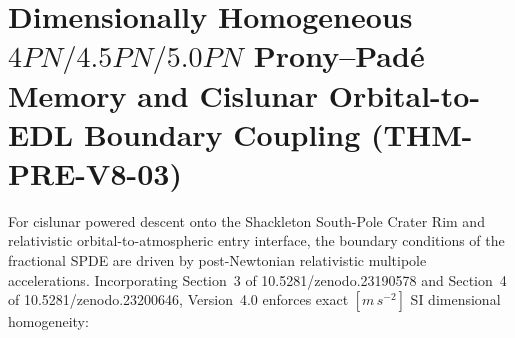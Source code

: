 \documentclass[11pt,a4paper,reqno]{article}
\def\texttt#1{#1}%
\def\mathrm#1{#1}%
\def\zenodo#1{10.5281/zenodo.#1}%
\newcommand{\zenodo}[1]{\href{https://doi.org/10.5281/zenodo.#1}{\texttt{10.5281/\allowbreak zenodo.#1}}}
\theoremstyle{plain}
\theoremstyle{definition}
\theoremstyle{remark}
\numberwithin{equation}{section}
\begin{document}
\section{Dimensionally Homogeneous \texorpdfstring{$4\mathrm{PN}/4.5\mathrm{PN}/5.0\mathrm{PN}$}{4PN/4.5PN/5.0PN} Prony--Pad\'e Memory and Cislunar Orbital-to-EDL Boundary Coupling (\texttt{THM-PRE-V8-03})}
\label{sec:hereditary_4pn_5pn_spde_v4}

For cislunar powered descent onto the Shackleton South-Pole Crater Rim and relativistic orbital-to-atmospheric entry interface, the boundary conditions of the fractional SPDE are driven by post-Newtonian relativistic multipole accelerations. Incorporating Section~3 of \zenodo{23190578} and Section~4 of \zenodo{23200646}, Version~4.0 enforces exact $[\mathrm{m\,s^{-2}}]$ SI dimensional homogeneity:
\end{document}
